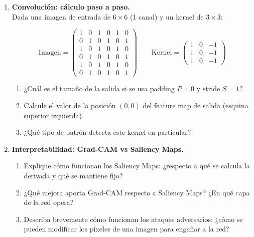 \documentclass[12pt,a4paper]{article}
\begin{document}
\begin{enumerate}[label=\arabic*)]
    \item \textbf{Convolución: cálculo paso a paso.} \\
    Dada una imagen de entrada de $6 \times 6$ (1 canal) y un kernel de $3 \times 3$:

    \[
    \text{Imagen} = \begin{pmatrix}
    1 & 0 & 1 & 0 & 1 & 0 \\
    0 & 1 & 0 & 1 & 0 & 1 \\
    1 & 0 & 1 & 0 & 1 & 0 \\
    0 & 1 & 0 & 1 & 0 & 1 \\
    1 & 0 & 1 & 0 & 1 & 0 \\
    0 & 1 & 0 & 1 & 0 & 1
    \end{pmatrix}
    \qquad
    \text{Kernel} = \begin{pmatrix}
    1 & 0 & -1 \\
    1 & 0 & -1 \\
    1 & 0 & -1
    \end{pmatrix}
    \]

    \begin{enumerate}[label=\alph*)]
        \item ¿Cuál es el tamaño de la salida si se usa padding $P=0$ y stride $S=1$?
        \item Calcule el valor de la posición $(0, 0)$ del feature map de salida (esquina superior izquierda).
        \item ¿Qué tipo de patrón detecta este kernel en particular?
    \end{enumerate}

    \item \textbf{Interpretabilidad: Grad-CAM vs Saliency Maps.} \\
    \begin{enumerate}[label=\alph*)]
        \item Explique cómo funcionan los Saliency Maps: ¿respecto a qué se calcula la derivada y qué se mantiene fijo?
        \item ¿Qué mejora aporta Grad-CAM respecto a Saliency Maps? ¿En qué capa de la red opera?
        \item Describa brevemente cómo funcionan los ataques adversarios: ¿cómo se pueden modificar los píxeles de una imagen para engañar a la red?
    \end{enumerate}


\end{enumerate}
\end{document}
